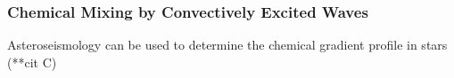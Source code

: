 {\color{purple}
\subsubsection{Chemical Mixing by Convectively Excited Waves}
}

Asteroseismology can be used to determine the chemical gradient profile in stars (**cit C)


